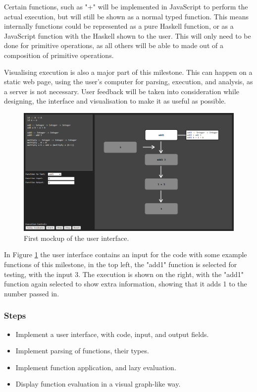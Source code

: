 \documentclass[a4paper]{article}
\begin{document}
Certain functions, such as "+" will be implemented in JavaScript to perform the actual execution, but will still be shown as a normal typed function. This means internally functions could be represented as a pure Haskell function, or as a JavaScript function with the Haskell shown to the user. This will only need to be done for primitive operations, as all others will be able to made out of a composition of primitive operations.

Visualising execution is also a major part of this milestone. This can happen on a static web page, using the user's computer for parsing, execution, and analysis, as a server is not necessary. User feedback will be taken into consideration while designing, the interface and visualisation to make it as useful as possible.
\begin{figure}[h]
    \includegraphics[width=\textwidth]{mockup-1}
    \caption{First mockup of the user interface.}
    \label{fig:mockup-1}
\end{figure}

In Figure \ref{fig:mockup-1} the user interface contains an input for the code with some example functions of this milestone, in the top left, the "add1" function is selected for testing, with the input 3. The execution is shown on the right, with the "add1" function again selected to show extra information, showing that it adds 1 to the number passed in.
\subsubsection{Steps}
\begin{itemize}
    \item Implement a user interface, with code, input, and output fields.
    \item Implement parsing of functions, their types.
    \item Implement function application, and lazy evaluation.
    \item Display function evaluation in a visual graph-like way.
\end{itemize}
\end{document}
